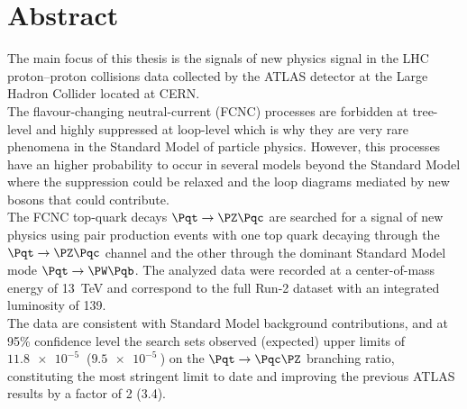 \chapter*{Abstract}        %

\vspace{-1cm}
\begin{adjustwidth}{1.5cm}{1.5cm}
	The main focus of this thesis is the signals of new physics signal in the
	LHC proton–proton collisions data collected by the ATLAS detector at 
	the Large Hadron Collider located at CERN.\\		
	The flavour-changing neutral-current (FCNC) processes are forbidden at tree-level and 
	highly suppressed at loop-level which is why they are very rare phenomena in the Standard Model of particle physics.
	However, this processes have an higher probability to occur in several models beyond the Standard Model where the 
	suppression could be relaxed and the loop diagrams mediated by new bosons that could contribute.\\	
	The FCNC top-quark decays $\mathrm{\Pqt\rightarrow\PZ\Pqc}$ are searched for a signal of new physics using 
	\ttbar pair production events with one top quark decaying through the $\mathrm{\Pqt\rightarrow\PZ\Pqc}$ channel 
	and the other through the dominant Standard Model mode $\mathrm{\Pqt\rightarrow\PW\Pqb}$.
	The analyzed data were recorded at a center-of-mass energy of \SI{13}{\TeV} and correspond to the full Run-2 dataset 
	with an integrated luminosity of \SI{139}{\ifb}.\\
	The data are consistent with Standard Model background contributions, and at 95\% confidence level the search sets observed (expected) upper limits of $\mathrm{\SI{11.8e-5}{}}$ ($\mathrm{\SI{9.5e-5}{}}$) on the $\mathrm{\Pqt\rightarrow\Pqc\PZ}$ branching ratio, constituting the most stringent limit to date and improving the previous ATLAS results by a factor of 2 (3.4).
	
	
\end{adjustwidth}



